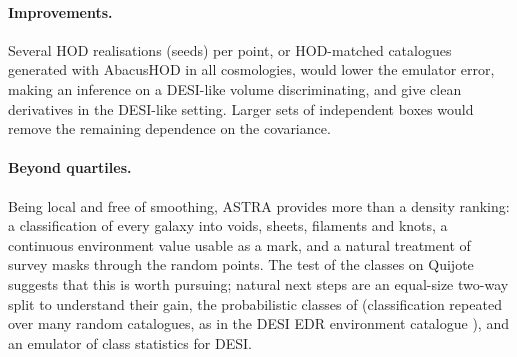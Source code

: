 \paragraph{Improvements.} Several HOD realisations (seeds) per point, or HOD-matched catalogues generated with AbacusHOD in all cosmologies, would lower the emulator error, making an inference on a DESI-like volume discriminating, and give clean derivatives in the DESI-like setting. Larger sets of independent boxes would remove the remaining dependence on the covariance.

\paragraph{Beyond quartiles.} Being local and free of smoothing, ASTRA provides more than a density ranking: a classification of every galaxy into voids, sheets, filaments and knots, a continuous environment value usable as a mark, and a natural treatment of survey masks through the random points. The test of the classes on Quijote suggests that this is worth pursuing; natural next steps are an equal-size two-way split to understand their gain, the probabilistic classes of \cite{ASTRA} (classification repeated over many random catalogues, as in the DESI EDR environment catalogue \cite{ZapataZuluaga2026}), and an emulator of class statistics for DESI.


